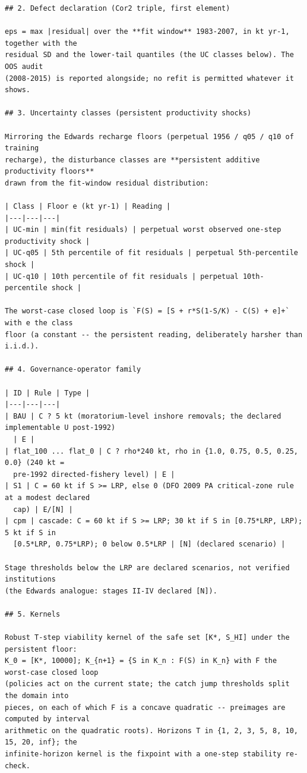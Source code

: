 \documentclass[11pt,a4paper]{article}
\begin{document}
\begin{footnotesize}
\begin{verbatim}
## 2. Defect declaration (Cor2 triple, first element)

eps = max |residual| over the **fit window** 1983-2007, in kt yr-1, together with the
residual SD and the lower-tail quantiles (the UC classes below). The OOS audit
(2008-2015) is reported alongside; no refit is permitted whatever it shows.

## 3. Uncertainty classes (persistent productivity shocks)

Mirroring the Edwards recharge floors (perpetual 1956 / q05 / q10 of training
recharge), the disturbance classes are **persistent additive productivity floors**
drawn from the fit-window residual distribution:

| Class | Floor e (kt yr-1) | Reading |
|---|---|---|
| UC-min | min(fit residuals) | perpetual worst observed one-step productivity shock |
| UC-q05 | 5th percentile of fit residuals | perpetual 5th-percentile shock |
| UC-q10 | 10th percentile of fit residuals | perpetual 10th-percentile shock |

The worst-case closed loop is `F(S) = [S + r*S(1-S/K) - C(S) + e]+` with e the class
floor (a constant -- the persistent reading, deliberately harsher than i.i.d.).

## 4. Governance-operator family

| ID | Rule | Type |
|---|---|---|
| BAU | C ? 5 kt (moratorium-level inshore removals; the declared implementable U post-1992)
  | E |
| flat_100 ... flat_0 | C ? rho*240 kt, rho in {1.0, 0.75, 0.5, 0.25, 0.0} (240 kt =
  pre-1992 directed-fishery level) | E |
| S1 | C = 60 kt if S >= LRP, else 0 (DFO 2009 PA critical-zone rule at a modest declared
  cap) | E/[N] |
| cpm | cascade: C = 60 kt if S >= LRP; 30 kt if S in [0.75*LRP, LRP); 5 kt if S in
  [0.5*LRP, 0.75*LRP); 0 below 0.5*LRP | [N] (declared scenario) |

Stage thresholds below the LRP are declared scenarios, not verified institutions
(the Edwards analogue: stages II-IV declared [N]).

## 5. Kernels

Robust T-step viability kernel of the safe set [K*, S_HI] under the persistent floor:
K_0 = [K*, 10000]; K_{n+1} = {S in K_n : F(S) in K_n} with F the worst-case closed loop
(policies act on the current state; the catch jump thresholds split the domain into
pieces, on each of which F is a concave quadratic -- preimages are computed by interval
arithmetic on the quadratic roots). Horizons T in {1, 2, 3, 5, 8, 10, 15, 20, inf}; the
infinite-horizon kernel is the fixpoint with a one-step stability re-check.


\end{verbatim}
\end{footnotesize}
\end{document}
